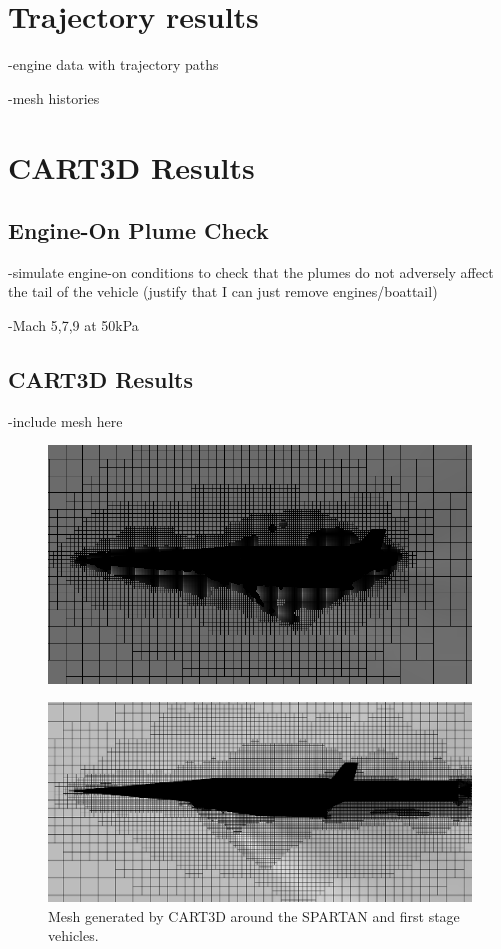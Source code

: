 
\chapter{Trajectory results}

-engine data with trajectory paths

-mesh histories




\chapter{CART3D Results}

\section{Engine-On Plume Check}
-simulate engine-on conditions to check that the plumes do not adversely affect the tail of the vehicle (justify that I can just remove engines/boattail)

-Mach 5,7,9 at 50kPa

\section{CART3D Results}
-include mesh here

\begin{figure}
	\centering
	\includegraphics[width=0.7\linewidth]{figures/3_vehicle_design/M3AoA6GRID}
	\caption{}
	\label{fig:M3AoA6GRID}
\end{figure}

		\begin{figure}
			\centering
			\includegraphics[width=0.7\linewidth]{figures/3_vehicle_design/CARTmesh}
			\caption{ Mesh generated by CART3D around the SPARTAN and first stage vehicles.}
			\label{fig:CARTmesh}
		\end{figure}
		
